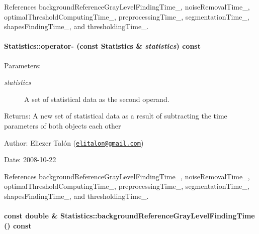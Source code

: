 References backgroundReferenceGrayLevelFindingTime\_\-, noiseRemovalTime\_\-, optimalThresholdComputingTime\_\-, preprocessingTime\_\-, segmentationTime\_\-, shapesFindingTime\_\-, and thresholdingTime\_\-.\hypertarget{class_statistics_529bed34d909d88440214d6983779043}{
\paragraph[operator-]{ Statistics::operator- (const {\bf Statistics} \& {\em statistics}) const}\hfill}
\label{class_statistics_529bed34d909d88440214d6983779043}


\begin{Desc}
\item[Parameters:]
\begin{description}
\item[{\em statistics}]A set of statistical data as the second operand.\end{description}
\end{Desc}
\begin{Desc}
\item[Returns:]A new set of statistical data as a result of subtracting the time parameters of both objects each other\end{Desc}
\begin{Desc}
\item[Author:]Eliezer Talón (\href{mailto:elitalon@gmail.com}{\tt elitalon@gmail.com}) \end{Desc}
\begin{Desc}
\item[Date:]2008-10-22 \end{Desc}


References backgroundReferenceGrayLevelFindingTime\_\-, noiseRemovalTime\_\-, optimalThresholdComputingTime\_\-, preprocessingTime\_\-, segmentationTime\_\-, shapesFindingTime\_\-, and thresholdingTime\_\-.\hypertarget{class_statistics_d70a464a72d94c795097608e2a18550a}{
\paragraph[backgroundReferenceGrayLevelFindingTime]{\setlength{\rightskip}{0pt plus 5cm}const double \& Statistics::backgroundReferenceGrayLevelFindingTime () const}\hfill}
\label{class_statistics_d70a464a72d94c795097608e2a18550a}



